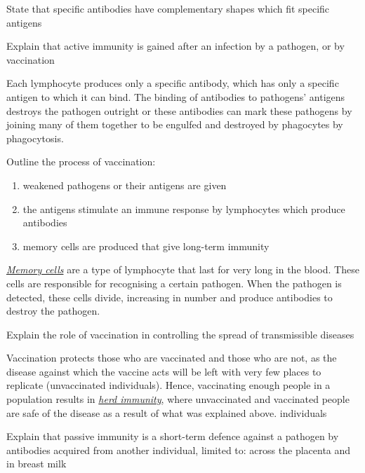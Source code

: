 \begin{point}
State that specific antibodies have complementary shapes which fit specific antigens
\end{point}

\begin{point}
Explain that active immunity is gained after an infection by a pathogen, or by vaccination
\end{point}

Each lymphocyte produces only a specific antibody, which has only a specific antigen to which it
can bind. The binding of antibodies to pathogens' antigens destroys the pathogen outright or
these antibodies can mark these pathogens by joining many of them together to be engulfed and
destroyed by phagocytes by phagocytosis.

\begin{point}
Outline the process of vaccination: 
\begin{enumerate}[label=(\alph*)]
	\setlength\itemsep{0em}
	\item weakened pathogens or their antigens are given
	\item the antigens stimulate an immune response by lymphocytes which produce antibodies
	\item memory cells are produced that give long-term immunity
\end{enumerate}
\end{point}

\ul{\emph{Memory cells}} are a type of lymphocyte that last for very long in the blood.
These cells are responsible for recognising a certain pathogen. When the pathogen is detected,
these cells divide, increasing in number and produce antibodies to destroy the pathogen.

\begin{point}
Explain the role of vaccination in controlling the spread of transmissible diseases
\end{point}

Vaccination protects those who are vaccinated and those who are not, as the disease against which
the vaccine acts will be left with very few places to replicate (unvaccinated individuals). Hence, 
vaccinating enough people in a population results in \ul{\emph{herd immunity}}, where
unvaccinated and vaccinated people are safe of the disease as a result of what was explained
above.
individuals

\begin{point}
Explain that passive immunity is a short-term defence against a pathogen by antibodies acquired from 
another individual, limited to: across the placenta and in breast milk
\end{point}

